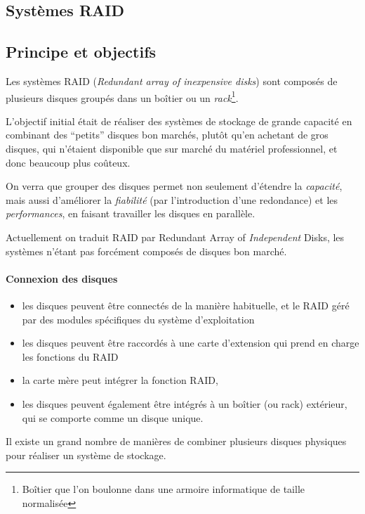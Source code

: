 \begin{multicols}{2}
\section{Systèmes RAID}

\subsection{Principe et objectifs}

Les systèmes RAID (\emph{Redundant array of inexpensive disks}) sont composés
de plusieurs disques groupés dans un boîtier ou un
\emph{rack}\footnote{Boîtier que l'on boulonne dans une armoire
  informatique de taille normalisée}.



 L'objectif initial était de réaliser des systèmes
de stockage de grande capacité en combinant des ``petits'' disques bon marchés,
plutôt qu'en achetant de gros disques, qui n'étaient disponible que sur
marché du matériel professionnel, et donc beaucoup plus coûteux.


On verra que grouper des disques permet non seulement d'étendre la
\emph{capacité}, mais aussi d'améliorer la \emph{fiabilité} (par
l'introduction d'une redondance) et les \emph{performances}, en faisant
travailler les disques en parallèle.

Actuellement on traduit RAID par
Redundant Array of \emph{Independent} Disks, les systèmes n'étant pas
forcément composés de disques bon marché.


\paragraph{Connexion des disques}
\begin{itemize}
\item les disques peuvent être connectés de la manière habituelle, et
  le RAID géré par des modules spécifiques du système d'exploitation
\item les disques  peuvent être raccordés à une carte d'extension qui prend
en charge les fonctions du RAID
\item la carte mère peut intégrer la fonction RAID,
\item les disques peuvent également être intégrés à un boîtier (ou
  rack) extérieur, qui se comporte comme un disque unique.
\end{itemize}


Il existe un grand nombre de manières de combiner plusieurs disques
physiques pour réaliser un système de stockage.


\end{multicols}

